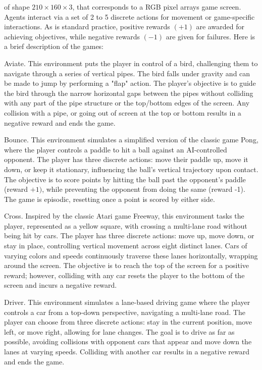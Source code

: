 \documentclass[10pt]{article}
\begin{document}
of shape $210 \times 160 \times 3$, that corresponds to a RGB pixel arrays game screen. Agents interact via a set of 2 to 5 discrete actions for movement or game-specific interactions. As is standard practice, positive rewards $(+1)$ are awarded for achieving objectives, while negative rewards $(-1)$ are given for failures. Here is a brief description of the games:

Aviate. This environment puts the player in control of a bird, challenging them to navigate through a series of vertical pipes. The bird falls under gravity and can be made to jump by performing a "flap" action. The player's objective is to guide the bird through the narrow horizontal gaps between the pipes without colliding with any part of the pipe structure or the top/bottom edges of the screen. Any collision with a pipe, or going out of screen at the top or bottom results in a negative reward and ends the game.

Bounce. This environment simulates a simplified version of the classic game Pong, where the player controls a paddle to hit a ball against an AI-controlled opponent. The player has three discrete actions: move their paddle up, move it down, or keep it stationary, influencing the ball's vertical trajectory upon contact. The objective is to score points by hitting the ball past the opponent's paddle (reward $+1)$, while preventing the opponent from doing the same (reward -1). The game is episodic, resetting once a point is scored by either side.

Cross. Inspired by the classic Atari game Freeway, this environment tasks the player, represented as a yellow square, with crossing a multi-lane road without being hit by cars. The player has three discrete actions: move up, move down, or stay in place, controlling vertical movement across eight distinct lanes. Cars of varying colors and speeds continuously traverse these lanes horizontally, wrapping around the screen. The objective is to reach the top of the screen for a positive reward; however, colliding with any car resets the player to the bottom of the screen and incurs a negative reward.

Driver. This environment simulates a lane-based driving game where the player controls a car from a top-down perspective, navigating a multi-lane road. The player can choose from three discrete actions: stay in the current position, move left, or move right, allowing for lane changes. The goal is to drive as far as possible, avoiding collisions with opponent cars that appear and move down the lanes at varying speeds. Colliding with another car results in a negative reward and ends the game.
\end{document}

